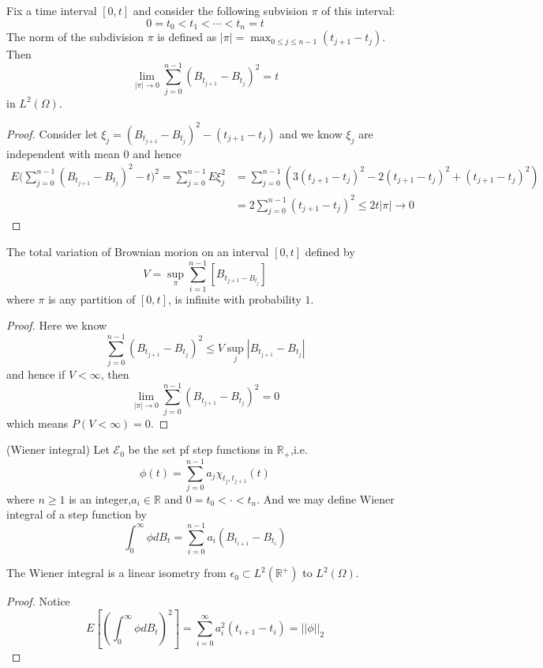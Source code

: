 \documentclass[lang=en, color=blue, ]{elegantbook}
\newcommand{\R}{\mathbb{R}}
\begin{document}
\begin{proposition}
    Fix a time interval $[0,t]$ and consider the following subvision $\pi$ of this interval:
    \[0 = t_0 < t_1 < \cdots<t_n = t\]
    The norm of the subdivision $\pi$ is defined as $|\pi| = \max_{0\leq j \leq n-1}(t_{j+1}-t_j)$. Then
    \[\lim_{|\pi|\to 0} \sum\limits_{j=0}^{n-1}(B_{t_{j+1}}-B_{t_j})^2 = t\]
    in $L^2(\Omega)$.
\end{proposition}  
\begin{proof}\par
    Consider let $\xi_j =(B_{t_{j+1}}-B_{t_j})^2 - (t_{j+1}-t_j)$ and we know $\xi_j$ are independent with mean $0$ and hence
    \[
    \begin{aligned}
    E\Big(\sum\limits_{j=0}^{n-1}(B_{t_{j+1}}-B_{t_j})^2-t\Big)^2 = \sum\limits_{j=0}^{n-1}E\xi_j^2 &= \sum\limits_{j=0}^{n-1}(3(t_{j+1}-t_j)^2 - 2(t_{j+1}-t_j)^2+(t_{j+1}-t_j)^2) \\ &= 2\sum\limits_{j=0}^{n-1}(t_{j+1}-t_j)^2 \leq 2t|\pi| \to 0
    \end{aligned}
    \]
\end{proof}
\begin{proposition}
    The total variation of Brownian morion on an interval $[0,t]$ defined by
    \[V = \sup_{\pi} \sum\limits_{i=1}^{n-1} [B_{t_{j+1}-B_{t_j}}]\]
    where $\pi$ is any partition of $[0,t]$, is infinite with probability $1$.
\end{proposition}
\begin{proof}\par
    Here we know
    \[
    \sum\limits_{j=0}^{n-1}(B_{t_{j+1}}-B_{t_j})^2 \leq V\sup_{j}|B_{t_{j+1}}-B_{t_j}|
    \]
    and hence if $V<\infty$, then
    \[
    \lim_{|\pi|\to 0}\sum\limits_{j=0}^{n-1}(B_{t_{j+1}}-B_{t_j})^2 = 0
    \]
    which means $P(V<\infty) = 0$.
\end{proof}

\begin{definition}
    (Wiener integral) Let $\mathcal{E}_0$ be the set pf step functions in $\R_+$,i.e.
    \[\phi(t) = \sum\limits_{j=0}^{n-1}a_j\chi_{t_j,t_{j+1}}(t)\]
    where $n\geq 1$ is an integer,$a_i \in \R$ and $0 = t_0 < \cdot < t_n$. And we may define Wiener integral of a step function by
    \[
    \int_0^{\infty} \phi dB_t = \sum\limits_{i=0}^{n-1}a_i(B_{t_{i+1}}-B_{t_i}) 
    \]
\end{definition}

\begin{proposition}
    The Wiener integral is a linear isometry from $\epsilon_0\subset L^2(\R^+)$ to $L^2(\Omega)$.
\end{proposition}
\begin{proof}
    Notice 
    \[
    E[(\int_0^{\infty} \phi dB_t)^2] = \sum\limits_{i=0}^{\infty}a_i^2(t_{i+1}-t_i) = ||\phi||_2    
    \]
\end{proof}
\end{document}
